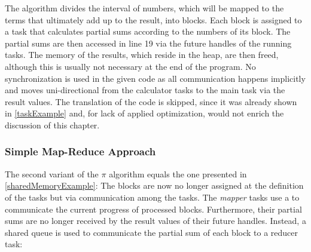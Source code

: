 The algorithm divides the interval of numbers, which will be mapped to the terms that ultimately add up to the result, into blocks. Each block is assigned to a task that calculates partial sums according to the numbers of its block. The partial sums are then accessed in line 19 via the future handles of the running tasks. The memory of the results, which reside in the heap, are then freed, although this is usually not necessary at the end of the program. No synchronization is used in the given code as all communication happens implicitly and moves uni-directional from the calculator tasks to the main task via the result values. The translation of the code is skipped, since it was already shown in \ref{taskExample} and, for lack of applied optimization, would not enrich the discussion of this chapter. 

\subsubsection{Simple Map-Reduce Approach}
\label{mapReduceApproach}
The second variant of the $\pi$ algorithm equals the one presented in \ref{sharedMemoryExample}: The blocks are now no longer assigned at the definition of the tasks but via communication among the tasks. The \textit{mapper} tasks use a  to communicate the current progress of processed blocks. Furthermore, their partial sums are no longer received by the result values of their future handles. Instead, a shared queue is used to communicate the partial sum of each block to a reducer task:

